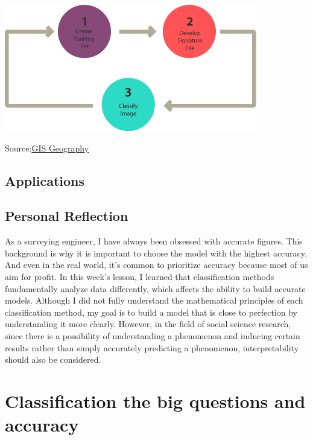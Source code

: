 \documentclass[
  letterpaper,
  DIV=11,
  numbers=noendperiod]{scrreprt}
\begin{document}
\includegraphics{./images/paste-0BFC54B9.png}

Source:\href{https://gisgeography.com/supervised-unsupervised-classification-arcgis/}{GIS
Geography}

\hypertarget{applications-4}{%
\section{Applications}\label{applications-4}}

\hypertarget{personal-reflection-4}{%
\section{Personal Reflection}\label{personal-reflection-4}}

As a surveying engineer, I have always been obsessed with accurate
figures. This background is why it is important to choose the model with
the highest accuracy. And even in the real world, it's common to
prioritize accuracy because most of us aim for profit. In this week's
lesson, I learned that classification methods fundamentally analyze data
differently, which affects the ability to build accurate models.
Although I did not fully understand the mathematical principles of each
classification method, my goal is to build a model that is close to
perfection by understanding it more clearly. However, in the field of
social science research, since there is a possibility of understanding a
phenomenon and inducing certain results rather than simply accurately
predicting a phenomenon, interpretability should also be considered.


\hypertarget{classification-the-big-questions-and-accuracy}{%
\chapter{Classification the big questions and
accuracy}\label{classification-the-big-questions-and-accuracy}}
\end{document}
